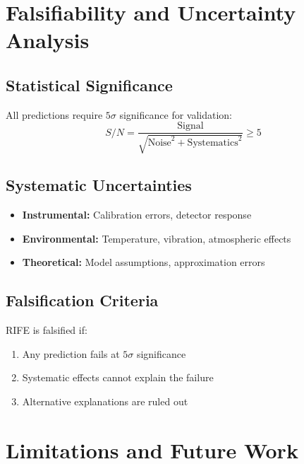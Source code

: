 \documentclass[11pt]{article}
\begin{document}
\section{Falsifiability and Uncertainty Analysis}

\subsection{Statistical Significance}
All predictions require $5\sigma$ significance for validation:
\begin{equation}
S/N = \frac{\text{Signal}}{\sqrt{\text{Noise}^2 + \text{Systematics}^2}} \geq 5
\end{equation}

\subsection{Systematic Uncertainties}
\begin{itemize}
\item \textbf{Instrumental:} Calibration errors, detector response
\item \textbf{Environmental:} Temperature, vibration, atmospheric effects
\item \textbf{Theoretical:} Model assumptions, approximation errors
\end{itemize}

\subsection{Falsification Criteria}
RIFE is falsified if:
\begin{enumerate}
\item Any prediction fails at $5\sigma$ significance
\item Systematic effects cannot explain the failure
\item Alternative explanations are ruled out
\end{enumerate}

\section{Limitations and Future Work}
\end{document}
